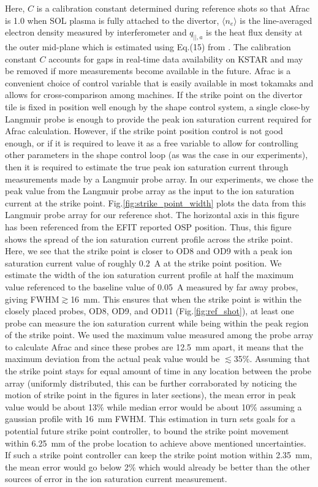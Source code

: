 \documentclass[10pt]{iopart}
\begin{document}
Here, $C$ is a calibration constant determined during reference shots so that \ac{Afrac} is 1.0 when \ac{SOL} plasma is fully attached to the divertor, $\langle n_{e} \rangle$ is the line-averaged electron density measured by interferometer and $q_{||, a}$ is the heat flux density at the outer mid-plane which is estimated using Eq.(15) from \cite{Eldon_2022_PPCF}.
The calibration constant $C$ accounts for gaps in real-time data availability on KSTAR and may be removed if more measurements become available in the future.
\ac{Afrac} is a convenient choice of control variable that is easily available in most tokamaks and allows for cross-comparison among machines.
If the strike point on the divertor tile is fixed in position well enough by the shape control system, a single close-by Langmuir probe is enough to provide the peak ion saturation current required for \ac{Afrac} calculation.
However, if the strike point position control is not good enough, or if it is required to leave it as a free variable to allow for controlling other parameters in the shape control loop (as was the case in our experiments), then it is required to estimate the true peak ion saturation current through measurements made by a Langmuir probe array.
In our experiments, we chose the peak value from the Langmuir probe array as the input to the ion saturation current at the strike point.
Fig.\ref{fig:strike_point_width} plots the data from this Langmuir probe array for our reference shot.
The horizontal axis in this figure has been referenced from the EFIT reported \ac{OSP} position.
Thus, this figure shows the spread of the ion saturation current profile across the strike point.
Here, we see that the strike point is closer to OD8 and OD9 with a peak ion saturation current value of roughly 0.2~A at the strike point position.
We estimate the width of the ion saturation current profile at half the maximum value referenced to the baseline value of 0.05~A measured by far away probes, giving FWHM$\gtrsim$16~mm.
This ensures that when the strike point is within the closely placed probes, OD8, OD9, and OD11 (Fig.\ref{fig:ref_shot}), at least one probe can measure the ion saturation current while being within the peak region of the strike point.
We used the maximum value measured among the probe array to calculate \ac{Afrac} and since these probes are 12.5~mm apart, it means that the maximum deviation from the actual peak value would be $\lesssim$35\%.
Assuming that the strike point stays for equal amount of time in any location between the probe array (uniformly distributed, this can be further corraborated by noticing the motion of strike point in the figures in later sections), the mean error in peak value would be about 13\% while median error would be about 10\% assuming a gaussian profile with 16~mm FWHM.
This estimation in turn sets goals for a potential future strike point controller, to bound the strike point movement within 6.25~mm of the probe location to achieve above mentioned uncertainties.
If such a strike point controller can keep the strike point motion within 2.35~mm, the mean error would go below 2\% which would already be better than the other sources of error in the ion saturation current measurement.
\end{document}

